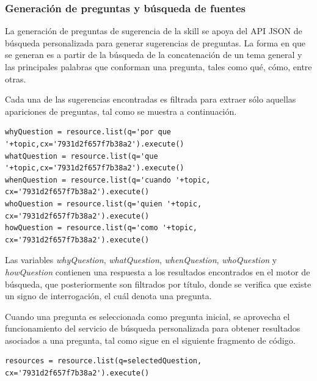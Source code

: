 
\subsubsection{Generación de preguntas y búsqueda de fuentes}
\label{GeneracionPreguntasBusquedaFuentescapIV}

La generación de preguntas de sugerencia de la skill se apoya del API JSON de búsqueda personalizada para generar sugerencias de preguntas. La forma en que se generan es a partir de la búsqueda de la concatenación de un tema general y las principales palabras que conforman una pregunta, tales como qué, cómo, entre otras.

Cada una de las sugerencias encontradas es filtrada para extraer sólo aquellas apariciones de preguntas, tal como se muestra a continuación.

\begin{tcolorbox}[colback=white!25!white,colframe=blue]
  \begin{verbatim}
whyQuestion = resource.list(q='por que '+topic,cx='7931d2f657f7b38a2').execute()
whatQuestion = resource.list(q='que '+topic,cx='7931d2f657f7b38a2').execute()
whenQuestion = resource.list(q='cuando '+topic, cx='7931d2f657f7b38a2').execute()
whoQuestion = resource.list(q='quien '+topic, cx='7931d2f657f7b38a2').execute()
howQuestion = resource.list(q='como '+topic, cx='7931d2f657f7b38a2').execute()
  \end{verbatim}
\end{tcolorbox}

Las variables \textit{whyQuestion}, \textit{whatQuestion}, \textit{whenQuestion}, \textit{whoQuestion} y \textit{howQuestion} contienen una respuesta a los resultados encontrados en el motor de búsqueda, que posteriormente son filtrados por título, donde se verifica que existe un signo de interrogación, el cuál denota una pregunta.

Cuando una pregunta es seleccionada como pregunta inicial, se aprovecha el funcionamiento del servicio de búsqueda personalizada para obtener resultados asociados a una pregunta, tal como sigue en el siguiente fragmento de código.

\begin{tcolorbox}[colback=white!25!white,colframe=blue]
  \begin{verbatim}
resources = resource.list(q=selectedQuestion, cx='7931d2f657f7b38a2').execute()
  \end{verbatim}
\end{tcolorbox}

